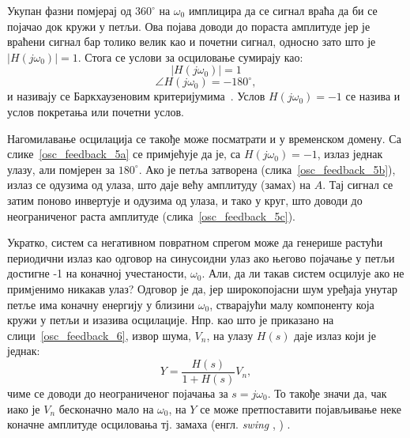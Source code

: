 \documentclass[master]{finthesis}
\makeatletter
\newcommand*{\engl}[2][\@empty]{%
    \edef\theacronym{#1}%
    (енгл. \foreignlanguage{english}{\emph{#2}%
    \ifx\theacronym\@empty \else , #1\fi})%
}
\makeatother
\begin{document}


Укупан фазни помјерај од $360^{\circ}$ на $\omega_{0}$ имплицира да се сигнал враћа да би се појачао док кружи у петљи. Ова појава доводи до пораста амплитуде јер је враћени сигнал бар толико велик као и почетни сигнал, односно зато што је $|H(j\omega_{0})|=1$. Стога се услови за осциловање сумирају као:
\begin{equation} 
	\label{osc_condition_1}
	|H(j\omega_{0})| = 1
\end{equation}
\begin{equation} 
	\label{osc_condition_2}
	\angle H(j\omega_{0}) = -180^{\circ},
\end{equation}
и називају се Баркхаузеновим критеријумима~\cite{Razavi:PLL_CMOS_2020}. Услов $H(j\omega_{0})=-1$ се назива и услов покретања или почетни услов. \par
Нагомилавање осцилација се такође може посматрати и у временском домену. Са слике~\ref{osc_feedback_5a} се примјећује да је, са $H(j\omega_{0})=-1$, излаз једнак улазу, али помјерен за $180^{\circ}$. Ако је петља затворена (слика~\ref{osc_feedback_5b}), излаз се одузима од улаза, што даје већу амплитуду (замах) на $A$. Тај сигнал се затим поново инвертује и одузима од улаза, и тако у круг, што доводи до неограниченог раста амплитуде (слика~\ref{osc_feedback_5c}). \par

Укратко, систем са негативном повратном спрегом може да генерише растући периодични излаз као одговор на синусоидни улаз ако његово појачање у петљи достигне -1 на коначној учестаности, $\omega_{0}$. Али, да ли такав систем осцилује ако не примjенимо никакав улаз? Одговор је да, јер широкопојасни шум уређаја унутар петље има коначну енергију у близини $\omega_{0}$, стварајући малу компоненту која кружи у петљи и изазива осцилације. Нпр. као што је приказано на слици~\ref{osc_feedback_6}, извор шума, $V_{n}$, на улазу $H(s)$ даје излаз који је једнак:
\begin{equation} 
	\label{osc_feedback_eq_8}
	Y = \frac{H(s)}{1+H(s)}V_{n},
\end{equation}
чиме се доводи до неограниченог појачања за $s=j\omega_{0}$. То такође значи да, чак иако је $V_{n}$ бесконачно мало на $\omega_{0}$, на $Y$ се може претпоставити појављивање неке коначне амплитуде осциловања тј. замаха \engl{swing}.

\end{document}
